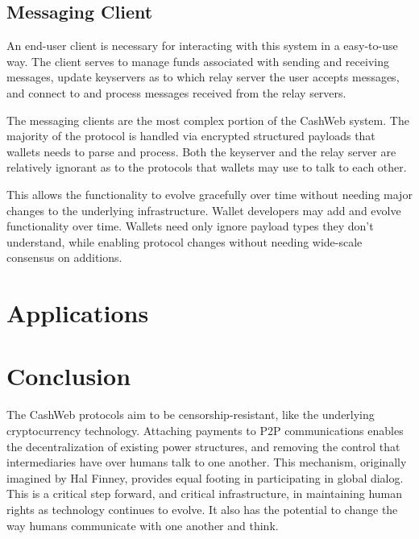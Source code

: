\documentclass{article}
\theoremstyle{definition}
\begin{document}
\subsection{Messaging Client}

An end-user client is necessary for interacting with this system in a easy-to-use way. The client serves to manage funds associated with sending and receiving messages,   update keyservers as to which relay server the user accepts messages, and connect to and process messages received from the relay servers.

The messaging clients are the most complex portion of the CashWeb system. The majority of the protocol is handled via encrypted structured payloads that wallets needs to parse and process. Both the keyserver and the relay server are relatively ignorant as to the protocols that wallets may use to talk to each other.

This allows the functionality to evolve gracefully over time without needing major changes to the underlying infrastructure. Wallet developers may add and evolve functionality over time. Wallets need only ignore payload types they don't understand, while enabling protocol changes without needing wide-scale consensus on additions.

\section{Applications}

\section{Conclusion}

The CashWeb protocols aim to be censorship-resistant, like the underlying cryptocurrency technology. Attaching payments to P2P communications enables the decentralization of existing power structures, and removing the control that intermediaries have over humans talk to one another. This mechanism, originally imagined by Hal Finney\cite{finney2004rpow}, provides equal footing in participating in global dialog. This is a critical step forward, and critical infrastructure, in maintaining human rights as technology continues to evolve. It also has the potential to change the way humans communicate with one another and think.

\cite{nakamoto2008bpp}




\end{document}

